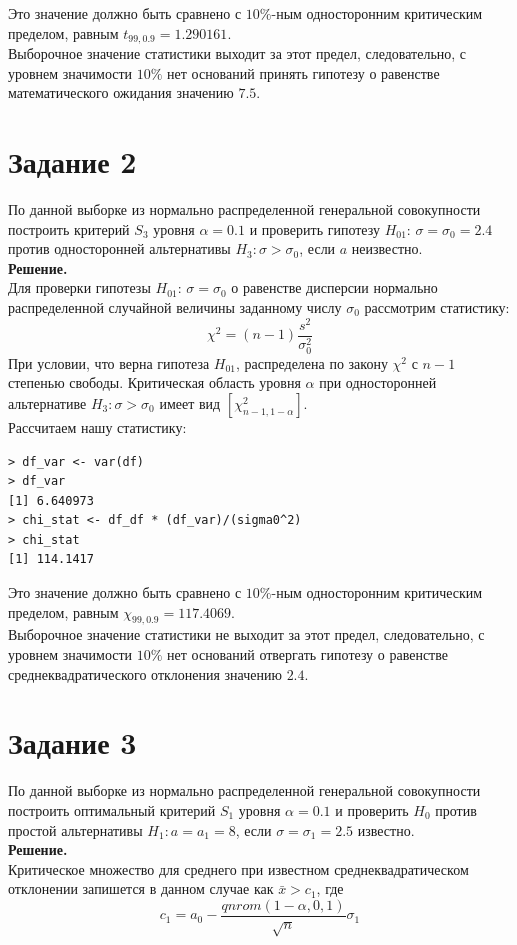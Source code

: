 \documentclass[14pt,a4paper]{scrartcl}
\begin{document}
Это значение должно быть сравнено с $10\%$-ным односторонним критическим пределом, равным $t_{99,0.9}=1.290161$.\\ Выборочное значение статистики выходит за этот предел, следовательно, с уровнем значимости $10\%$ нет оснований принять гипотезу о равенстве математического ожидания значению $7.5$.


\section*{Задание 2}\label{sec2}
По данной выборке из нормально  распределенной генеральной совокупности построить критерий $S_3$ уровня $\alpha=0.1$ и проверить гипотезу $H_{01}$: $\sigma=\sigma_0=2.4$  против односторонней альтернативы  $H_3: \sigma > \sigma_0$, если $a$ неизвестно.\\
\textbf{Решение.}\\
Для проверки гипотезы $H_{01}$: $\sigma=\sigma_0$ о равенстве дисперсии нормально распределенной случайной величины  заданному числу $\sigma_0$ рассмотрим статистику:
\begin{equation*}
	\chi^2 = (n-1)\frac{s^2}{\sigma_0^2}
\end{equation*}
При условии, что верна гипотеза $H_{01}$, распределена по закону $\chi^2$ с $n-1$ степенью свободы. Критическая область уровня $\alpha$ при односторонней альтернативе $H_3: \sigma > \sigma_0$ имеет вид $[\chi^2_{n-1,1-\alpha}]$.\\
Рассчитаем нашу статистику:
\begin{verbatim}
> df_var <- var(df)
> df_var
[1] 6.640973
> chi_stat <- df_df * (df_var)/(sigma0^2)
> chi_stat
[1] 114.1417
\end{verbatim}

Это значение должно быть сравнено с $10\%$-ным односторонним критическим пределом, равным $\chi_{99,0.9}=117.4069$.\\ Выборочное значение статистики не выходит за этот предел, следовательно, с уровнем значимости $10\%$ нет оснований отвергать гипотезу о равенстве среднеквадратического отклонения значению $2.4$.


\section*{Задание 3}
По данной выборке из нормально  распределенной генеральной совокупности построить оптимальный критерий $S_1$ уровня $\alpha = 0.1$ и проверить $H_0$ против простой альтернативы $H_1:a=a_1=8$, если $\sigma=\sigma_1=2.5$ известно.\\
\textbf{Решение.}\\
Критическое множество для среднего при известном среднеквадратическом отклонении запишется в данном случае как $\bar{x} > c_1$, где
\begin{equation*}
	c_1 = a_0 - \frac{qnrom(1-\alpha,0,1)}{\sqrt{n}}\sigma_1
\end{equation*}
\end{document}
